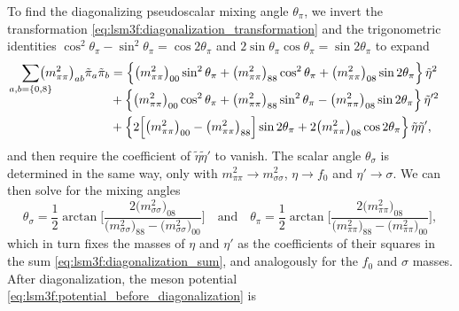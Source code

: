 To find the diagonalizing pseudoscalar mixing angle $\theta_\pi$,
we invert the transformation \eqref{eq:lsm3f:diagonalization_transformation} and the trigonometric identities $\cos^2 \theta_\pi - \sin^2 \theta_\pi = \cos 2 \theta_\pi$ and $2 \sin\theta_\pi \cos\theta_\pi = \sin 2 \theta_\pi$ to expand
\begin{equation}
\begin{split}
	\smash{\smashoperator{\sum_{a,b=\{0,8\}}}} \big(m^2_{\pi\pi}\big)_{ab} \tilde{\pi}_a \tilde{\pi}_b &= \Big\{ \big(m^2_{\pi\pi}\big)_{00} \sin^2 \theta_\pi + \big(m^2_{\pi\pi}\big)_{88} \cos^2 \theta_\pi + \big(m^2_{\pi\pi}\big)_{08} \sin 2 \theta_\pi \Big\} \, \tilde{\eta}^2 \\
	                                                                                                   &+ \Big\{ \big(m^2_{\pi\pi}\big)_{00} \cos^2 \theta_\pi + \big(m^2_{\pi\pi}\big)_{88} \sin^2 \theta_\pi - \big(m^2_{\pi\pi}\big)_{08} \sin 2 \theta_\pi \Big\} \, \tilde{\eta}'^2 \\
	                                                                                                   &+ \Big\{ 2 \Big[ \big(m^2_{\pi\pi}\big)_{00} - \big(m^2_{\pi\pi}\big)_{88} \Big] \sin 2 \theta_\pi + 2 \big(m^2_{\pi\pi}\big)_{08} \cos 2 \theta_\pi \Big\} \, \tilde{\eta} \tilde{\eta}' ,
\end{split}
\label{eq:lsm3f:diagonalization_sum}
\end{equation}
and then require the coefficient of $\tilde{\eta} \tilde{\eta}'$ to vanish.
The scalar angle $\theta_\sigma$ is determined in the same way, only with $m^2_{\pi\pi} \rightarrow m^2_{\sigma\sigma}$, $\eta \rightarrow f_0$ and $\eta' \rightarrow \sigma$.
We can then solve for the mixing angles
\begin{equation}
	\theta_\sigma = \frac12 \arctan \Bigg[ \frac{2\big(m^2_{\sigma\sigma}\big)_{08}}{\big(m^2_{\sigma\sigma}\big)_{88} - \big(m^2_{\sigma\sigma}\big)_{00}} \Bigg]
	\quad \text{and} \quad
	\theta_\pi = \frac12 \arctan \Bigg[ \frac{2\big(m^2_{\pi\pi}\big)_{08}}{\big(m^2_{\pi\pi}\big)_{88} - \big(m^2_{\pi\pi}\big)_{00}} \Bigg],
\label{eq:lsm3f:mixing_angles}
\end{equation}
which in turn fixes the masses of $\eta$ and $\eta'$ as the coefficients of their squares in the sum \eqref{eq:lsm3f:diagonalization_sum}, and analogously for the $f_0$ and $\sigma$ masses.
After diagonalization, the meson potential \eqref{eq:lsm3f:potential_before_diagonalization} is
